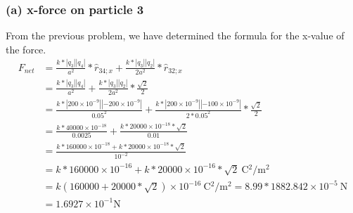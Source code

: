 \documentclass[12pt]{article}
\begin{document}
\subsubsection*{(a) x-force on particle 3}
From the previous problem, we have determined the formula for the x-value of the force.
\begin{align*}
    F_{net} &=  \frac{k*|q_3||q_4|}{a^2}*\hat{r}_{34;x} + \frac{k*|q_3||q_2|}{2a^2}*\hat{r}_{32;x}\\
            &=  \frac{k*|q_3||q_4|}{a^2} + \frac{k*|q_3||q_2|}{2a^2}*\frac{\sqrt{2}}{2}\\
            &=  \frac{k*|200 \times 10^{-9}||-200 \times 10^{-9}|}{0.05^2} + \frac{k*|200 \times 10^{-9}||-100 \times 10^{-9}|}{2*0.05^2}*\frac{\sqrt{2}}{2}\\
            &=  \frac{k*40000 \times 10^{-18}}{0.0025} + \frac{k*20000 \times 10^{-18}*\sqrt{2}}{0.01}\\
            &=  \frac{k*160000 \times 10^{-18} + k*20000 \times 10^{-18}*\sqrt{2}}{10^{-2}}\\
            &=  k*160000 \times 10^{-16} + k*20000 \times 10^{-16}*\sqrt{2}\ \unit{\coulomb^2/\meter^2}\\
            &=  k(160000 + 20000*\sqrt{2}) \times 10^{-16}\ \unit{\coulomb^2/\meter^2}
            =   8.99*1882.842 \times 10^{-5}\ \unit{\newton}\\
            &=  \boxed{1.6927 \times 10^{-1} \unit{\newton}}
\end{align*}
\end{document}
